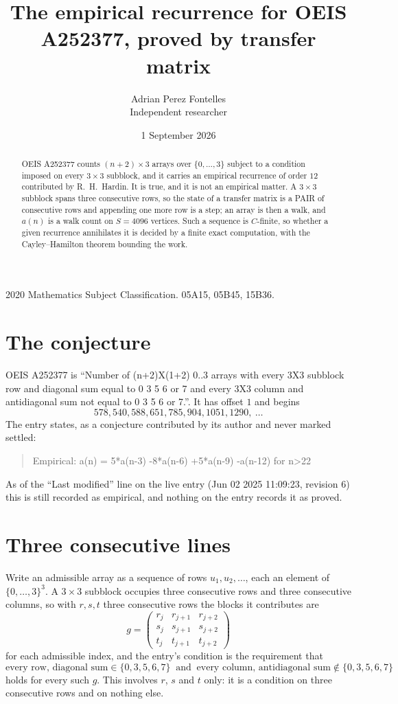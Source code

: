 \documentclass[11pt,a4paper]{article}
\title{The empirical recurrence for OEIS A252377, proved by transfer matrix}
\author{Adrian Perez Fontelles\\ \small Independent researcher}
\date{1 September 2026}
\theoremstyle{plain}
\theoremstyle{definition}
\begin{document}
\maketitle

\begin{abstract}
OEIS A252377 counts $(n+2)\times3$ arrays over $\{0,\dots,3\}$ subject to a condition imposed on
every $3\times3$ subblock, and it carries an empirical recurrence of order $12$
contributed by R.~H.~Hardin. It is true, and it is not an empirical matter. A $3\times3$
subblock spans three consecutive rows, so the state of a transfer matrix is a PAIR of
consecutive rows and appending one more row is a step; an array is then a walk, and
$a(n)$ is a walk count on $S=4096$ vertices. Such a sequence is $C$-finite, so whether a given
recurrence annihilates it is decided by a finite exact computation, with the Cayley--Hamilton
theorem bounding the work.
\end{abstract}

\noindent\small 2020 Mathematics Subject Classification. 05A15, 05B45, 15B36.\normalsize

\section{The conjecture}

OEIS A252377 is ``Number of (n+2)X(1+2) 0..3 arrays with every 3X3 subblock row and diagonal sum equal to 0 3 5 6 or 7 and every 3X3 column and antidiagonal sum not equal to 0 3 5 6 or 7.''. It has offset $1$ and begins
\[
578, 540, 588, 651, 785, 904, 1051, 1290,\ \dots
\]
The entry states, as a conjecture contributed by its author and never marked settled:
\begin{quote}
Empirical: a(n) = 5*a(n-3) -8*a(n-6) +5*a(n-9) -a(n-12) for n>22
\end{quote}
As of the ``Last modified'' line on the live entry (Jun 02 2025 11:09:23, revision 6) this is still
recorded as empirical, and nothing on the entry records it as proved.

\section{Three consecutive lines}

Write an admissible array as a sequence of rows $u_1,u_2,\dots$, each an element of
$\{0,\dots,3\}^{3}$. A $3\times3$ subblock occupies three consecutive rows and
three consecutive columns, so with $r,s,t$ three consecutive rows the blocks it
contributes are
\[
g=\begin{pmatrix}r_j&r_{j+1}&r_{j+2}\\ s_j&s_{j+1}&s_{j+2}\\ t_j&t_{j+1}&t_{j+2}\end{pmatrix}
\]
for each admissible index, and the entry's condition is the requirement that
\[
\text{every row, diagonal sum} \in \{0,3,5,6,7\}\ \text{ and }\ \text{every column, antidiagonal sum} \notin \{0,3,5,6,7\}
\]
holds for every such $g$. This involves $r$, $s$ and $t$ only: it is a condition on
three consecutive rows and on nothing else.
\end{document}
